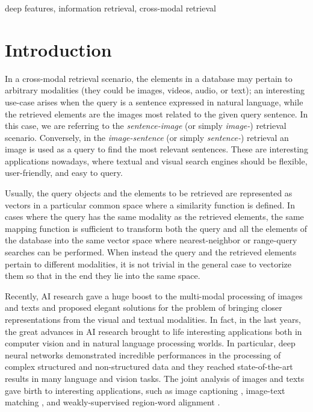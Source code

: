 \documentclass[conference]{IEEEtran}
\begin{document}
\begin{IEEEkeywords}
deep features, information retrieval, cross-modal retrieval
\end{IEEEkeywords}

\section{Introduction}
In a cross-modal retrieval scenario, the elements in a database may pertain to arbitrary modalities (they could be images, videos, audio, or text); an interesting use-case arises when the query is a sentence expressed in natural language, while the retrieved elements are the images most related to the given query sentence. In this case, we are referring to the \textit{sentence-image} (or simply \textit{image-}) retrieval scenario. 
Conversely, in the \textit{image-sentence} (or simply \textit{sentence-}) retrieval an image is used as a query to find the most relevant sentences. %
These are interesting applications nowadays, where textual and visual search engines should be flexible, user-friendly, and easy to query.

Usually, the query objects and the elements to be retrieved are represented as vectors in a particular common space where a similarity function is defined. In cases where the query has the same modality as the retrieved elements, the same mapping function is sufficient to transform both the query and all the elements of the database into the same vector space where nearest-neighbor or range-query searches can be performed. When instead the query and the retrieved elements pertain to different modalities, it is not trivial in the general case to vectorize them so that in the end they lie into the same space.  

Recently, AI research gave a huge boost to the multi-modal processing of images and texts and proposed elegant solutions for the problem of bringing closer representations from the visual and textual modalities.
In fact, in the last years, the great advances in AI research brought to life interesting applications both in computer vision and in natural language processing worlds. In particular, deep neural networks demonstrated incredible performances in the processing of complex structured and non-structured data and they reached state-of-the-art results in many language and vision tasks. The joint analysis of images and texts gave birth to interesting applications, such as image captioning \cite{xu2015showattendtell,anderson2018butdimagecaptioning}, image-text matching \cite{li2019,vsepp2018faghri,lee2019,lu2019vilbert}, and weakly-supervised region-word alignment \cite{karpathy2015alignment,lee2018stackedcrossattention}.
\end{document}
